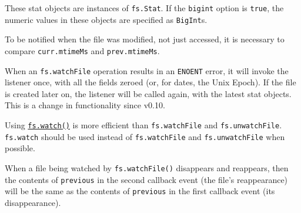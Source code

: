 \begin{Shaded}
\begin{Highlighting}[]
 \OperatorTok{;}

\NormalTok{(}\OperatorTok{,}\OperatorTok{,}\KeywordTok{=\textgreater{}}\NormalTok{ \{}
  \NormalTok{(}\SpecialCharTok{$\{}\SpecialCharTok{\}}\VerbatimStringTok{\textasciigrave{}}\NormalTok{)}\OperatorTok{;}
  \NormalTok{(}\SpecialCharTok{$\{}\SpecialCharTok{\}}\VerbatimStringTok{\textasciigrave{}}\NormalTok{)}\OperatorTok{;}
\NormalTok{\})}\OperatorTok{;}
\end{Highlighting}
\end{Shaded}

These stat objects are instances of \texttt{fs.Stat}. If the
\texttt{bigint} option is \texttt{true}, the numeric values in these
objects are specified as \texttt{BigInt}s.

To be notified when the file was modified, not just accessed, it is
necessary to compare \texttt{curr.mtimeMs} and \texttt{prev.mtimeMs}.

When an \texttt{fs.watchFile} operation results in an \texttt{ENOENT}
error, it will invoke the listener once, with all the fields zeroed (or,
for dates, the Unix Epoch). If the file is created later on, the
listener will be called again, with the latest stat objects. This is a
change in functionality since v0.10.

Using \hyperref[fswatchfilename-options-listener]{\texttt{fs.watch()}}
is more efficient than \texttt{fs.watchFile} and
\texttt{fs.unwatchFile}. \texttt{fs.watch} should be used instead of
\texttt{fs.watchFile} and \texttt{fs.unwatchFile} when possible.

When a file being watched by \texttt{fs.watchFile()} disappears and
reappears, then the contents of \texttt{previous} in the second callback
event (the file's reappearance) will be the same as the contents of
\texttt{previous} in the first callback event (its disappearance).

